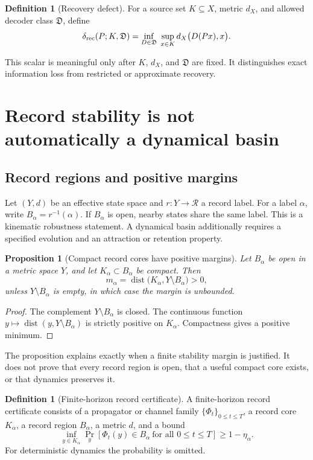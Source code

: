 \documentclass[11pt]{article}
\newtheorem{proposition}[theorem]{Proposition}
\theoremstyle{definition}
\newtheorem{definition}[theorem]{Definition}
\theoremstyle{remark}
\DeclareMathOperator{\dist}{dist}
\begin{document}
\begin{definition}[Recovery defect]
For a source set \(K\subseteq X\), metric \(d_X\), and allowed decoder class
\(\mathfrak D\), define
\[
 \delta_{\rm rec}(P;K,\mathfrak D)
 =
 \inf_{D\in\mathfrak D}\;
 \sup_{x\in K} d_X\bigl(D(Px),x\bigr).
\]
\end{definition}

This scalar is meaningful only after \(K\), \(d_X\), and \(\mathfrak D\) are
fixed. It distinguishes exact information loss from restricted or approximate
recovery.

\section{Record stability is not automatically a dynamical basin}
\label{sec:stability}

\subsection{Record regions and positive margins}

Let \((Y,d)\) be an effective state space and \(r:Y\to\mathcal R\) a record
label. For a label \(\alpha\), write \(B_\alpha=r^{-1}(\alpha)\).
If \(B_\alpha\) is open, nearby states share the same label. This is a
kinematic robustness statement. A dynamical basin additionally requires a
specified evolution and an attraction or retention property.

\begin{proposition}[Compact record cores have positive margins]
\label{prop:record-margin}
Let \(B_\alpha\) be open in a metric space \(Y\), and let
\(K_\alpha\subset B_\alpha\) be compact. Then
\[
 m_\alpha
 =
 \dist\bigl(K_\alpha,Y\setminus B_\alpha\bigr)>0,
\]
unless \(Y\setminus B_\alpha\) is empty, in which case the margin is
unbounded.
\end{proposition}

\begin{proof}
The complement \(Y\setminus B_\alpha\) is closed. The continuous function
\(y\mapsto \dist(y,Y\setminus B_\alpha)\) is strictly positive on
\(K_\alpha\). Compactness gives a positive minimum.
\end{proof}

The proposition explains exactly when a finite stability margin is justified.
It does not prove that every record region is open, that a useful compact core
exists, or that dynamics preserves it.

\begin{definition}[Finite-horizon record certificate]
A finite-horizon record certificate consists of a propagator or channel family
\(\{\Phi_t\}_{0\leq t\leq T}\), a record core \(K_\alpha\), a record region
\(B_\alpha\), a metric \(d\), and a bound
\[
 \inf_{y\in K_\alpha}
 \Pr_y\!\left[
   \Phi_t(y)\in B_\alpha\ \text{for all }0\leq t\leq T
 \right]
 \geq 1-\eta_\alpha.
\]
For deterministic dynamics the probability is omitted.
\end{definition}
\end{document}
